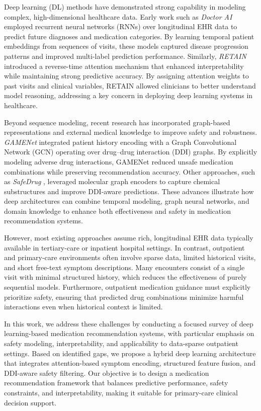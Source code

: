 \documentclass[conference,onecolumn]{IEEEtran}
\begin{document}
Deep learning (DL) methods have demonstrated strong capability in modeling complex, high-dimensional healthcare data. Early work such as \textit{Doctor AI} \cite{choi2016doctorai} employed recurrent neural networks (RNNs) over longitudinal EHR data to predict future diagnoses and medication categories. By learning temporal patient embeddings from sequences of visits, these models captured disease progression patterns and improved multi-label prediction performance. Similarly, \textit{RETAIN} \cite{choi2016retain} introduced a reverse-time attention mechanism that enhanced interpretability while maintaining strong predictive accuracy. By assigning attention weights to past visits and clinical variables, RETAIN allowed clinicians to better understand model reasoning, addressing a key concern in deploying deep learning systems in healthcare.

Beyond sequence modeling, recent research has incorporated graph-based representations and external medical knowledge to improve safety and robustness. \textit{GAMENet} \cite{shang2019gamenet} integrated patient history encoding with a Graph Convolutional Network (GCN) operating over drug--drug interaction (DDI) graphs. By explicitly modeling adverse drug interactions, GAMENet reduced unsafe medication combinations while preserving recommendation accuracy. Other approaches, such as \textit{SafeDrug} \cite{lee2021safedrug}, leveraged molecular graph encoders to capture chemical substructures and improve DDI-aware predictions. These advances illustrate how deep architectures can combine temporal modeling, graph neural networks, and domain knowledge to enhance both effectiveness and safety in medication recommendation systems.

However, most existing approaches assume rich, longitudinal EHR data typically available in tertiary-care or inpatient hospital settings. In contrast, outpatient and primary-care environments often involve sparse data, limited historical visits, and short free-text symptom descriptions. Many encounters consist of a single visit with minimal structured history, which reduces the effectiveness of purely sequential models. Furthermore, outpatient medication guidance must explicitly prioritize safety, ensuring that predicted drug combinations minimize harmful interactions even when historical context is limited.

In this work, we address these challenges by conducting a focused survey of deep learning-based medication recommendation systems, with particular emphasis on safety modeling, interpretability, and applicability to data-sparse outpatient settings. Based on identified gaps, we propose a hybrid deep learning architecture that integrates attention-based symptom encoding, structured feature fusion, and DDI-aware safety filtering. Our objective is to design a medication recommendation framework that balances predictive performance, safety constraints, and interpretability, making it suitable for primary-care clinical decision support.
\end{document}
